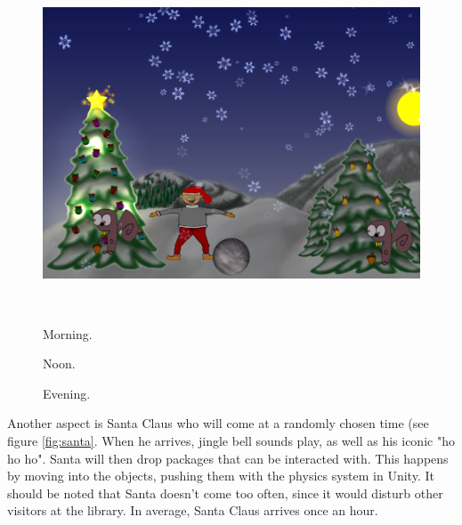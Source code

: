 \begin{figure}[htbp]
\begin{minipage}[b]{0.3\textwidth}
		\includegraphics[width=1.00\textwidth]{Pictures/Design/time3.png} %
	\end{minipage}\\ %
	\begin{minipage}[t]{0.3\textwidth}
		\caption{Morning.} %
		\label{fig:time1}
	\end{minipage}\hfill
	\begin{minipage}[t]{0.3\textwidth}
		\caption{Noon.} %
		\label{fig:time2}
	\end{minipage}\hfill	
	\begin{minipage}[t]{0.3\textwidth}
		\caption{Evening.} %
		\label{fig:time3}
	\end{minipage}
\end{figure}

Another aspect is Santa Claus who will come at a randomly chosen time (see figure \ref{fig:santa}. When he arrives, jingle bell sounds play, as well as his iconic "ho ho ho". Santa will then drop packages that can be interacted with. This happens by moving into the objects, pushing them with the physics system in Unity. It should be noted that Santa doesn't come too often, since it would disturb other visitors at the library. In average, Santa Claus arrives once an hour.

